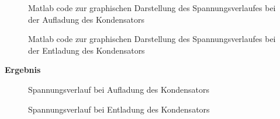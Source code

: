        \begin{figure}[H]
            
            \caption{Matlab code zur graphischen Darstellung des Spannungsverlaufes bei der Aufladung des Kondensators}
        \end{figure}
        
        \begin{figure}[H]
            
            \caption{Matlab code zur graphischen Darstellung des Spannungsverlaufes bei der Entladung des Kondensators}
        \end{figure}
        
        \vspace{4mm}
        \textbf{Ergebnis}
        \newline
        \par
        \begin{figure}[H]
            \def\svgwidth{\textwidth}
            
            
            \caption{Spannungsverlauf bei Aufladung des Kondensators}
        \end{figure}
        \begin{figure}[H]
            \def\svgwidth{\textwidth}
            
            
            \caption{Spannungsverlauf bei Entladung des Kondensators}
        \end{figure}
        
        \clearpage
